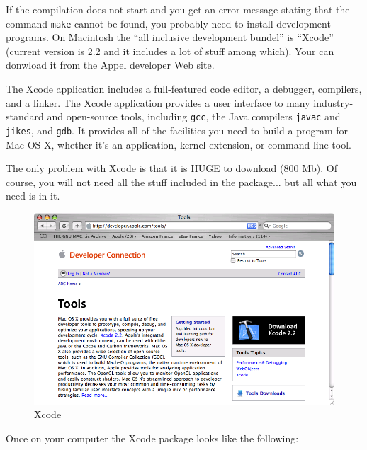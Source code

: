 \bigskip
\noindent If the compilation does not start and you get an error message
stating that the command \verb+make+ cannot be found, you probably need to
install development programs. On Macintosh the ``all inclusive development
bundel'' is ``Xcode'' (current version is 2.2 and it includes a lot
of stuff among which). Your can donwload it from the Appel developer Web site.

\bigskip
\noindent The Xcode application includes a full-featured code editor, a debugger, 
compilers, and a linker. The Xcode application provides a user interface to many 
industry-standard and open-source tools, including \verb+gcc+, the Java compilers
\verb+javac+ and \verb+jikes+, and \verb+gdb+. It provides all of the facilities you
need to build a program for Mac OS X, whether it's an application, kernel
extension, or command-line tool.

\bigskip
\noindent The only problem with Xcode is that it is HUGE to download (800 Mb).
Of course, you will not need all the stuff included in the package... but all
what you need is in it.

\begin{figure}[!h]
\begin{center}
\includegraphics[width=15cm]{resources/img/fig-mac4.png}
\caption{Xcode\label{fig-mac4}}
\end{center}
\end{figure}


\bigskip
\noindent Once on your computer the Xcode package looks like the following:

